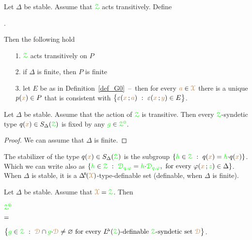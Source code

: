\begin{theorem}\label{thm_FER2}
  Let $\Delta$ be stable.
  Assume that ${\color{green}\EuScript Z}$ acts transitively.
  Define \smallskip
  
  . \smallskip
  
  Then the following hold
  \begin{itemize}
    \item [1.] ${\color{green}\EuScript Z}$ acts transitively on $P$
    \item [2.] if $\Delta$ is finite, then $P$ is finite
    
    \item [3.] let $E$ be as in Definition~\ref{def_G0}~--~then for every ${\color{brown} a}\in{\color{brown}\EuScript X}$ there is a unique $p({\color{brown} x})\in P$ that is consistent with $\big\{\epsilon({\mr x}\,;{\mr a})\ :\ \epsilon({\mr x}\,;{\mr y})\in E\big\}$.
  \end{itemize}
\end{theorem}

\begin{proposition}
  Let $\Delta$ be stable.
  Assume that the action of ${\color{green}\EuScript Z}$ is transitive.
  Then every ${\color{green}\EuScript Z}$-syndetic type $q({\color{brown} x})\in S_\Delta({\color{green}\EuScript Z})$ is fixed by any ${\color{green} g}\in\color{green}\EuScript Z^0$.
\end{proposition}

\begin{proof}
  We can assume that $\Delta$ is finite.
\end{proof}

The stabilizer of the type $q({\color{brown} x})\in S_\Delta({\color{green}\EuScript Z})$ is the subgroup $\{{\color{green} h}\in{\color{green}\EuScript Z}\ :\ q({\color{brown} x})={\color{green} h}{\cdot}q({\color{brown} x})\}$.
Which we can write also as $\{{\gr h}\in\grZ\ :\ {\gr\D_{q,\phi}}={\gr h}{\cdot}{\gr\D_{q,\phi}},\textrm{ for every }\phi({\mr x}\,;{\gr z})\in\Delta\}$.
When $\Delta$ is stable, it is a $\BDelta(\mrX)$-type-definable set (definable, when $\Delta$ is finite).

\def\medrel#1{\parbox[t]{6ex}{$\displaystyle\hfil #1$}}
\def\ceq#1#2#3{\parbox[t]{5ex}{$\displaystyle #1$}\medrel{#2}$\displaystyle  #3$}
\begin{theorem}\label{thm_Z0_stable}
  Let $\Delta$ be stable.
  Assume that ${\color{brown}\EuScript X}={\color{green}\EuScript Z}$.
  Then\smallskip
  
  \ceq{\hfill{\gr\Z^0}}{=}{\big\{{\gr g}\in\grZ\ :\ \mrD\cap{\gr g}{\cdot}\mrD\neq\varnothing\textrm{ for every }\LDelta(\grZ)\textrm{-definable }\grZ\textrm{-syndetic set }\mrD\big\}}.
  
\end{theorem}

